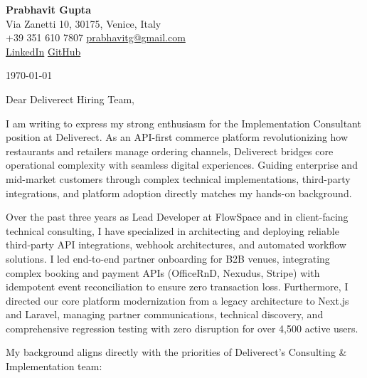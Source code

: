 \documentclass[11pt,a4paper]{article}
\begin{document}
\begin{center}
    {\huge \textbf{Prabhavit Gupta}} \\
    \vspace{4pt}
    Via Zanetti 10, 30175, Venice, Italy \\
    +39 351 610 7807 \textbar{} \href{mailto:prabhavitg@gmail.com}{prabhavitg@gmail.com} \\
    \href{https://www.linkedin.com/in/prabhavit/}{LinkedIn} \textbar{} \href{https://github.com/prab-gupta}{GitHub}
\end{center}

\vspace{14pt}

\noindent \today

\vspace{6pt}

\noindent Dear Deliverect Hiring Team,

\vspace{6pt}

\noindent I am writing to express my strong enthusiasm for the Implementation Consultant position at Deliverect. As an API-first commerce platform revolutionizing how restaurants and retailers manage ordering channels, Deliverect bridges core operational complexity with seamless digital experiences. Guiding enterprise and mid-market customers through complex technical implementations, third-party integrations, and platform adoption directly matches my hands-on background.

\noindent Over the past three years as Lead Developer at FlowSpace and in client-facing technical consulting, I have specialized in architecting and deploying reliable third-party API integrations, webhook architectures, and automated workflow solutions. I led end-to-end partner onboarding for B2B venues, integrating complex booking and payment APIs (OfficeRnD, Nexudus, Stripe) with idempotent event reconciliation to ensure zero transaction loss. Furthermore, I directed our core platform modernization from a legacy architecture to Next.js and Laravel, managing partner communications, technical discovery, and comprehensive regression testing with zero disruption for over 4,500 active users.

\noindent My background aligns directly with the priorities of Deliverect's Consulting \& Implementation team:
\end{document}
